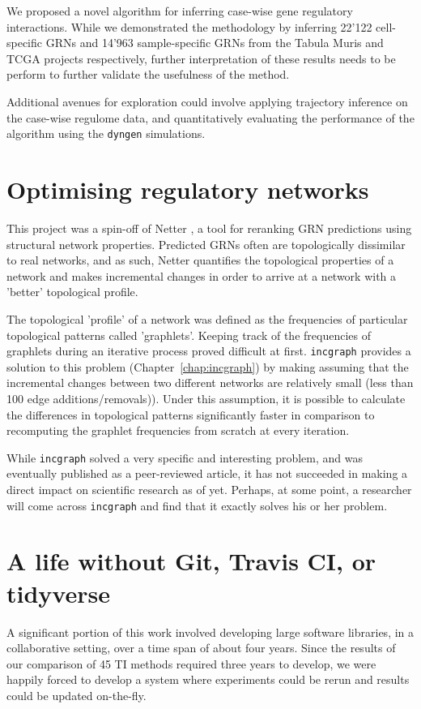 We proposed a novel algorithm for inferring case-wise gene regulatory interactions. While we demonstrated the methodology by inferring 22'122 cell-specific GRNs and 14'963 sample-specific GRNs from the Tabula Muris and TCGA projects respectively, further interpretation of these results needs to be perform to further validate the usefulness of the method.

Additional avenues for exploration could involve applying trajectory inference on the case-wise regulome data, and quantitatively evaluating the performance of the algorithm using the \texttt{dyngen} simulations.

\section{Optimising regulatory networks}
This project was a spin-off of Netter \cite{ruyssinck_netterrerankinggene_2016}, a tool for reranking GRN predictions using structural network properties. 
Predicted GRNs often are topologically dissimilar to real networks, and as such, Netter quantifies the topological properties of a network and makes incremental changes in order to arrive at a network with a 'better' topological profile.

The topological 'profile' of a network was defined as the frequencies of particular topological patterns called 'graphlets'. Keeping track of the frequencies of graphlets during an iterative process proved difficult at first. 
\texttt{incgraph} provides a solution to this problem (Chapter~\ref{chap:incgraph}) by making assuming that the incremental changes between two different networks are relatively small (less than 100 edge additions/removals)). Under this assumption, it is possible to calculate the differences in topological patterns significantly faster in comparison to recomputing the graphlet frequencies from scratch at every iteration.

While \texttt{incgraph} solved a very specific and interesting problem, and was eventually published as a peer-reviewed article, it has not succeeded in making a direct impact on scientific research as of yet. Perhaps, at some point, a researcher will come across \texttt{incgraph} and find that it exactly solves his or her problem.



\section{A life without Git, Travis CI, or tidyverse}
A significant portion of this work involved developing large software libraries, in a collaborative setting, over a time span of about four years. Since the results of our comparison of 45 TI methods required three years to develop, we were happily forced to develop a system where experiments could be rerun and results could be updated on-the-fly.

